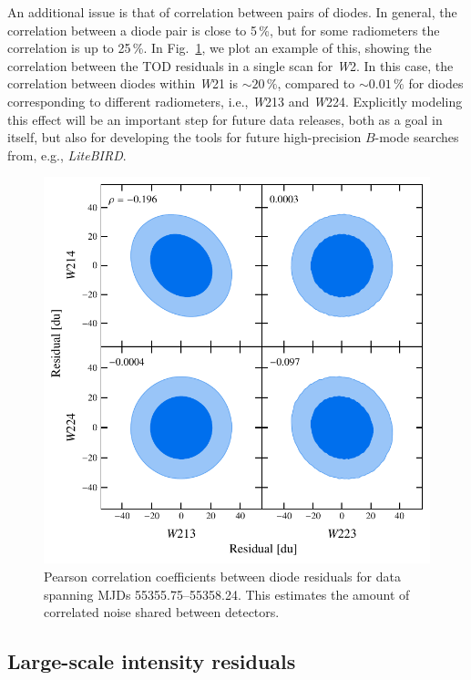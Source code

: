 \documentclass[twocolumn]{../../common/aa}
\newcommand{\W}[0]{\textit W}
\begin{document}
An additional issue is that of correlation between pairs of diodes. In general, the correlation between a diode pair is close to 5\,\%, but for some radiometers the correlation is up to 25\,\%. In Fig.~\ref{fig:example_corr}, we plot an example of this, showing the correlation between the TOD residuals in a single scan for \W2. In this case, the correlation between diodes within \W21 is ${\sim20\,\%}$, compared to $\sim0.01\,\%$ for diodes corresponding to different radiometers, i.e., \W213 and \W224. Explicitly modeling this effect will be an important step for future data releases, both as a goal in itself, but also for developing the tools for future high-precision $B$-mode searches from, e.g., \textit{LiteBIRD}.

\begin{figure}
	\includegraphics[width=\columnwidth]{figures/res_corr.pdf}
	\caption{Pearson correlation coefficients between diode residuals for data spanning MJDs 55355.75--55358.24. This estimates the amount of correlated noise shared between detectors.}
	\label{fig:example_corr}
\end{figure}
\subsection{Large-scale intensity residuals}
\end{document}
